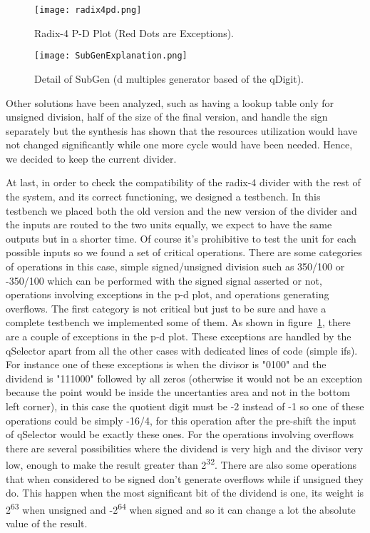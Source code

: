 \begin{figure}[H]
\centering
\texttt{[image: radix4pd.png]}
\caption{Radix-4 P-D Plot (Red Dots are Exceptions).}
\label{fig:div_pd_plot}
\end{figure}

\begin{figure}[H]
\centering
\texttt{[image: SubGenExplanation.png]}
\caption{Detail of SubGen (d multiples generator based of the qDigit).}
\label{fig:div_subGen}
\end{figure}

Other solutions have been analyzed, such as having a lookup table only for unsigned division, half
of the size of the final version, and handle the sign separately but the synthesis has shown that the
resources utilization would have not changed significantly while one more cycle would have been needed.
Hence, we decided to keep the current divider.

At last, in order to check the compatibility of the radix-4 divider with the rest of the system, and its correct functioning, we designed a testbench.
In this testbench we placed both the old version and the new version of the divider and the inputs are routed to the two units equally, we expect to have the same outputs but in a shorter time.
Of course it's prohibitive to test the unit for each possible inputs so we found a set of critical operations.
There are some categories of operations in this case, simple signed/unsigned division such as 350/100 or -350/100 which can be performed with the signed signal asserted or not, operations involving exceptions in the p-d plot, and operations generating overflows.
The first category is not critical but just to be sure and have a complete testbench we implemented some of them.
As shown in figure~\ref{fig:div_pd_plot}, there are a couple of exceptions in the p-d plot. These exceptions are handled by the qSelector apart from all the other cases with dedicated lines of code (simple ifs).
For instance one of these exceptions is when the divisor is "0100" and the dividend is "111000" followed by all zeros (otherwise it would not be an exception because the point would be inside the uncertanties area and not in the bottom left corner), in this case the quotient digit must be -2 instead of -1 so one of these operations could be simply -16/4, for this operation after the pre-shift the input of qSelector would be exactly these ones.
For the operations involving overflows there are several possibilities where the dividend is very high and the divisor very low, enough to make the result greater than 2\textsuperscript{32}. There are also some operations that when considered to be signed don't generate overflows while if unsigned they do. This happen when the most significant bit of the dividend is one, its weight is 2\textsuperscript{63} when unsigned and -2\textsuperscript{64} when signed and so it can change a lot the absolute value of the result.


